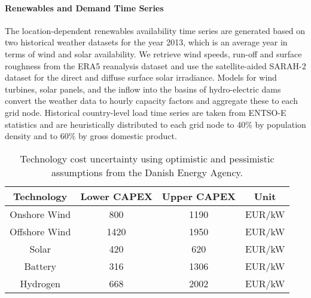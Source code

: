 
\paragraph{Renewables and Demand Time Series}
The location-dependent renewables availability time series are generated based
on two historical weather datasets for the year 2013, which is an average year
in terms of wind and solar availability. We retrieve wind speeds, run-off and
surface roughness from the ERA5 reanalysis dataset and use the satellite-aided
SARAH-2 dataset for the direct and diffuse surface solar irradiance. Models for
wind turbines, solar panels, and the inflow into the basins of hydro-electric
dams convert the weather data to hourly capacity factors and aggregate these to
each grid node. Historical country-level load time series are taken from ENTSO-E
statistics and are heuristically distributed to each grid node to 40\% by
population density and to 60\% by gross domestic product.


\begin{SCtable}
    \begin{small}
        \begin{tabular}{cccc}
            \toprule
            Technology & Lower CAPEX & Upper CAPEX & Unit  \\ \midrule
            Onshore Wind & 800 & 1190 & EUR/kW \\
            Offshore Wind & 1420 & 1950 & EUR/kW \\ %
            Solar & 420 & 620 & EUR/kW \\
            Battery & 316 & 1306 & EUR/kW \\
            Hydrogen & 668 & 2002 & EUR/kW \\ \bottomrule
        \end{tabular}
    \end{small}
    \caption[Technology Cost Uncertainty]{Technology cost uncertainty using optimistic and pessimistic assumptions from the Danish Energy Agency.\cite{DEA}}
    \label{tab:costuncertainty}
\end{SCtable}


